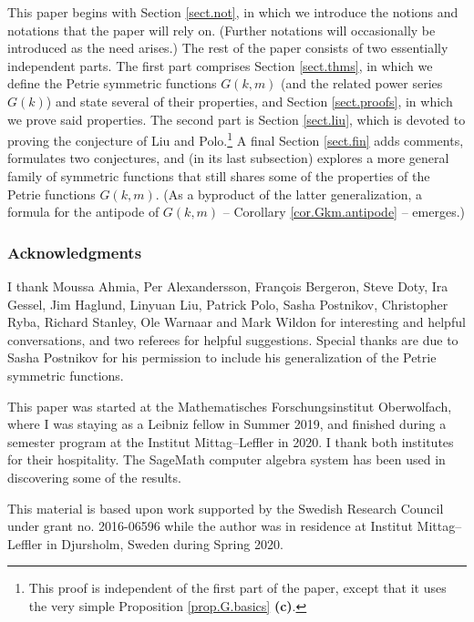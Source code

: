 \documentclass[numbers=enddot,12pt,final,onecolumn,notitlepage]{scrartcl}%
\theoremstyle{definition}
\newenvironment{fineprint}{\begin{small}}{\end{small}}
\begin{document}
This paper begins with Section \ref{sect.not}, in which we introduce the
notions and notations that the paper will rely on. (Further notations will
occasionally be introduced as the need arises.) The rest of the paper consists
of two essentially independent parts. The first part comprises Section
\ref{sect.thms}, in which we define the Petrie symmetric functions $G\left(
k,m\right)  $ (and the related power series $G\left(  k\right)  $) and state
several of their properties, and Section \ref{sect.proofs}, in which we prove
said properties. The second part is Section \ref{sect.liu}, which is devoted
to proving the conjecture of Liu and Polo.\footnote{This proof is independent
of the first part of the paper, except that it uses the very simple
Proposition \ref{prop.G.basics} \textbf{(c)}.} A final Section \ref{sect.fin}
adds comments, formulates two conjectures, and (in its last subsection)
explores a more general family of symmetric functions that still shares some
of the properties of the Petrie functions $G\left(  k,m\right)  $. (As a
byproduct of the latter generalization, a formula for the antipode of
$G\left(  k,m\right)  $ -- Corollary \ref{cor.Gkm.antipode} -- emerges.)

\subsubsection*{Acknowledgments}

I thank Moussa Ahmia, Per Alexandersson, Fran\c{c}ois Bergeron, Steve Doty,
Ira Gessel, Jim Haglund, Linyuan Liu, Patrick Polo, Sasha Postnikov,
Christopher Ryba, Richard Stanley, Ole Warnaar and Mark Wildon for interesting
and helpful conversations, and two referees for helpful suggestions. Special
thanks are due to Sasha Postnikov for his permission to include his
generalization of the Petrie symmetric functions.

This paper was started at the Mathematisches Forschungsinstitut Oberwolfach,
where I was staying as a Leibniz fellow in Summer 2019, and finished during a
semester program at the Institut Mittag--Leffler in 2020. I thank both
institutes for their hospitality. The SageMath computer algebra system
\cite{SageMath} has been used in discovering some of the results.

\begin{fineprint}
This material is based upon work supported by the Swedish Research Council
under grant no. 2016-06596 while the author was in residence at Institut
Mittag--Leffler in Djursholm, Sweden during Spring 2020.
\end{fineprint}
\end{document}
